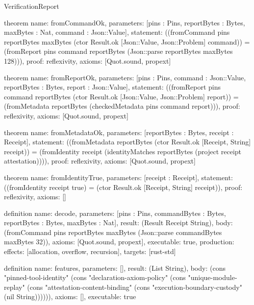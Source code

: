 \begin{lexlean}{VerificationReport}
\begin{semanticmodule}
theorem{
  name: fromCommandOk,
  parameters: [pins : Pins, reportBytes : Bytes, maxBytes : Nat, command : Json::Value],
  statement: ((fromCommand pins reportBytes maxBytes (ctor Result.ok [Json::Value, Json::Problem] command)) = (fromReport pins command reportBytes (Json::parse reportBytes maxBytes 128))),
  proof: reflexivity{},
  axioms: [Quot.sound, propext]
}

theorem{
  name: fromReportOk,
  parameters: [pins : Pins, command : Json::Value, reportBytes : Bytes, report : Json::Value],
  statement: ((fromReport pins command reportBytes (ctor Result.ok [Json::Value, Json::Problem] report)) = (fromMetadata reportBytes (checkedMetadata pins command report))),
  proof: reflexivity{},
  axioms: [Quot.sound, propext]
}

theorem{
  name: fromMetadataOk,
  parameters: [reportBytes : Bytes, receipt : Receipt],
  statement: ((fromMetadata reportBytes (ctor Result.ok [Receipt, String] receipt)) = (fromIdentity receipt (identityMatches reportBytes (project receipt attestation)))),
  proof: reflexivity{},
  axioms: [Quot.sound, propext]
}

theorem{
  name: fromIdentityTrue,
  parameters: [receipt : Receipt],
  statement: ((fromIdentity receipt true) = (ctor Result.ok [Receipt, String] receipt)),
  proof: reflexivity{},
  axioms: []
}

definition{
  name: decode,
  parameters: [pins : Pins, commandBytes : Bytes, reportBytes : Bytes, maxBytes : Nat],
  result: (Result Receipt String),
  body: (fromCommand pins reportBytes maxBytes (Json::parse commandBytes maxBytes 32)),
  axioms: [Quot.sound, propext],
  executable: true,
  production: {effects: [allocation, overflow, recursion], targets: [rust-std]}
}

definition{
  name: features,
  parameters: [],
  result: (List String),
  body: (cons "pinned-tool-identity" (cons "declaration-axiom-policy" (cons "unique-module-replay" (cons "attestation-content-binding" (cons "execution-boundary-custody" (nil String)))))),
  axioms: [],
  executable: true
}

\end{semanticmodule}
\end{lexlean}
